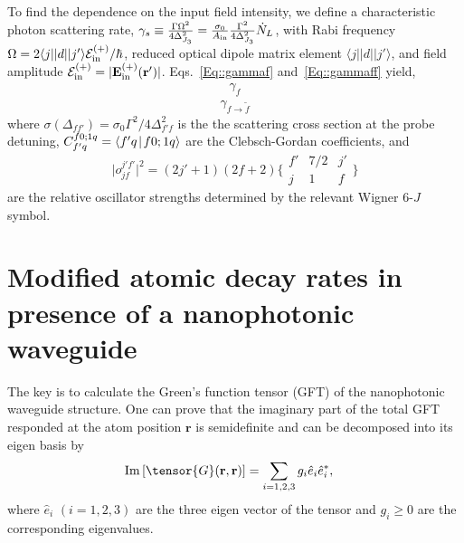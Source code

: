 \documentclass[preprint,aps,pra,onecolumn,superscriptaddress]{revtex4-1} %
\def\br{\mathbf{r}}
\def\bra#1{\langle{#1}\rvert}%
\def\ket#1{\lvert{#1}\rangle}%
\def\Braket#1#2{\mathinner{\langle{#1}\! \mid\! {#2} \rangle}}
\newcommand{\mbf}[1]{\mathbf{#1}}
\newcommand{\inp}{{\rm in}}
\begin{document}
\begin{appendix}
To find the dependence on the input field intensity, we define a characteristic photon scattering rate, $\gamma_s \equiv \frac{\Gamma\Omega^2}{4\Delta_{J_3}^2}= \frac{\sigma_0}{A_{\rm in}}\frac{\Gamma^2}{4 \Delta_{J_3}^2} \dot{N}_L $, with Rabi frequency $ \Omega=2\bra{j}|d|\ket{j'}\mathcal{E}^{(+)}_{\rm in}/\hbar $, reduced optical dipole matrix element $\bra{j}|d|\ket{j'}$, and field amplitude $ \mathcal{E}^{(+)}_{\rm in}=|\mathbf{E}_{\rm in}^{(+)}(\br')| $.
Eqs.~\eqref{Eq::gammaf} and~\eqref{Eq::gammaff} yield,
\begin{subequations}
	\begin{align}
		\gamma_f 
	\end{align}
\end{subequations}
	\begin{align}
		\gamma_{f \rightarrow \tilde{f}}
	\end{align}
where $ \sigma (\Delta_{ff'} )  = \sigma_0 \Gamma^2/4\Delta^2_{f' f}$ is the the scattering cross section at the probe detuning, $ C_{f'q}^{f0;1 q}=\Braket{f'q}{f0;1q}$ are the Clebsch-Gordan coefficients, and
\begin{equation}
\big| o_{jf}^{j'f'} \big|^2=(2j'+1)(2f+2) \bigg\{
\begin{array}{ccc}
f' & 7/2 & j' \\
 j & 1 & f
 \end{array}
 \bigg\}
\end{equation}
are the relative oscillator strengths determined by the relevant Wigner 6-$J$ symbol.

\section{Modified atomic decay rates in presence of a nanophotonic waveguide} \label{Appendix::decayratesimulation}
The key is to calculate the Green's function tensor (GFT) of the nanophotonic waveguide structure. 
One can prove that the imaginary part of the total GFT responded at the atom position $\mathbf{r}$ is semidefinite and can be decomposed into its eigen basis by
\begin{align}
\mathrm{Im}\left[\tensor{G}(\br,\br)\right] &=\sum_{i=1,2,3} g_i\hat{e}_i\hat{e}_i^*,
\end{align}
where $\hat{e}_i$ $(i=1,2,3)$ are the three eigen vector of the tensor and $g_i\ge 0$ are the corresponding eigenvalues.


\end{appendix}
\end{document}

